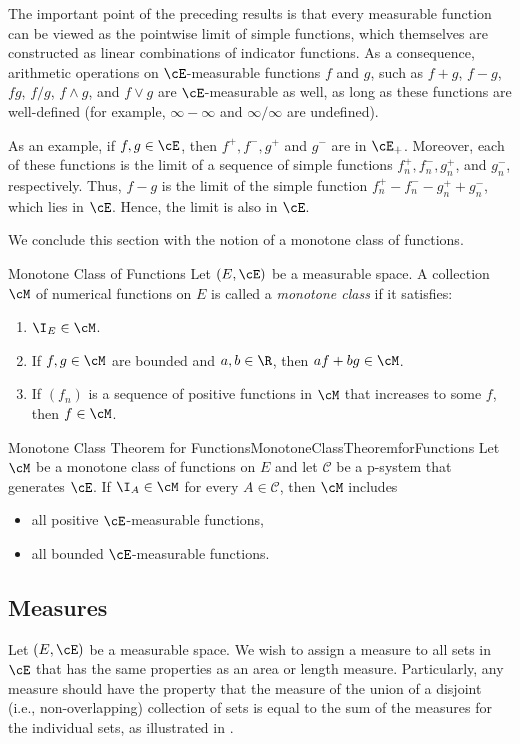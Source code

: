 The important point of the preceding results is that every measurable function can be viewed as the pointwise limit of simple functions, which themselves are constructed as linear combinations of indicator functions. As a consequence, arithmetic operations on $\cE$-measurable functions $f$ and $g$, such as $f + g$, $f - g$, $fg$, $f/g$, $f \wedge g$, and $f \vee g$ are $\cE$-measurable as well, as long as these functions are well-defined (for example, $\infty - \infty$ and $\infty/\infty$ are undefined).

As an example, if $f, g \in \cE$, then $f^+, f^-, g^+$ and $g^-$ are in $\cE_+$. Moreover, each of these functions is the limit of a sequence of simple functions $f_n^+, f_n^-, g_n^+$, and $g_n^-$, respectively. Thus, $f - g$ is the limit of the simple function $f_n^+ - f_n^- - g_n^+ + g_n^-$, which lies in $\cE$. Hence, the limit is also in $\cE$.

We conclude this section with the notion of a monotone class of functions.

\begin{defn}{Monotone Class of Functions}{}
	Let $(E, \cE)$ be a measurable space. A collection $\cM$ of numerical functions on $E$ is called a \textit{monotone class} if it satisfies:
	\begin{enumerate}
		\item $\I_E \in \cM$.
		\item If $f, g \in \cM$ are bounded and $a, b \in \R$, then $af + bg \in \cM$.
		\item If $(f_n)$ is a sequence of positive functions in $\cM$ that increases to some $f$, then $f \in \cM$.
	\end{enumerate}
\end{defn}

\begin{thm}{Monotone Class Theorem for Functions}{MonotoneClassTheoremforFunctions}
	Let $\cM$ be a monotone class of functions on $E$ and let $\mathcal{C}$ be a p-system that generates $\cE$. If $\I_A \in \cM$ for every $A \in \mathcal{C}$, then $\cM$ includes
	\begin{itemize}
		\item all positive $\cE$-measurable functions,
		\item all bounded $\cE$-measurable functions.
	\end{itemize}
\end{thm}

\subsection{Measures}
Let \((E,\cE)\) be a measurable space. We wish to assign a measure to all sets in \(\cE\) that has the same properties as an area or length measure. Particularly, any measure should have the property that the measure of the union of a disjoint (i.e., non-overlapping) collection of sets is equal to the sum of the measures for the individual sets, as illustrated in .

